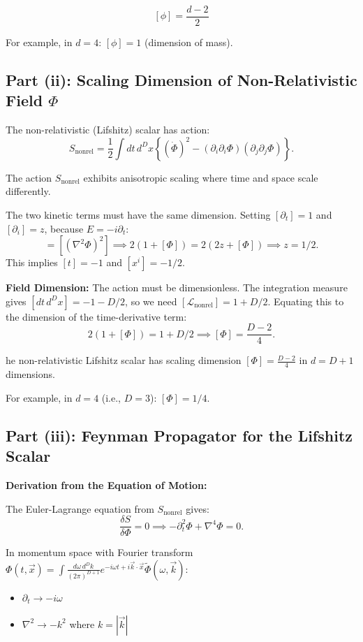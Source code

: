 \documentclass[11pt, a4paper]{article}
\newcommand{\Lscr}{\mathcal{L}}
\newcommand{\be}{\begin{equation}}
\newcommand{\ee}{\end{equation}}
\begin{document}
$$[\phi] = \frac{d-2}{2}$$

For example, in $d = 4$: $[\phi] = 1$ (dimension of mass).

\subsection{Part (ii): Scaling Dimension of Non-Relativistic Field $\Phi$}

The non-relativistic (Lifshitz) scalar has action:
\be
S_{\text{nonrel}}=\frac{1}{2}\int dt\, d^{D}x\left\{(\dot{\Phi})^{2}-(\partial_{i}\partial_{i}\Phi)(\partial_{j}\partial_{j}\Phi)\right\}.
\ee

The action $S_{\text{nonrel}}$ exhibits anisotropic scaling where time and space scale differently.

The two kinetic terms must have the same dimension. Setting $[\partial_t] = 1$ and $[\partial_i] = z$, because $E = -i\partial_t$:
\be
[(\dot{\Phi})^2] = [(\nabla^2\Phi)^2] \implies 2(1+[\Phi]) = 2(2z+[\Phi]) \implies z = 1/2.
\ee
This implies $[t] = -1$ and $[x^i] = -1/2$.

\textbf{Field Dimension:} The action must be dimensionless. The integration measure gives $[dt\,d^Dx] = -1 - D/2$, so we need $[\Lscr_{\text{nonrel}}] = 1 + D/2$. Equating this to the dimension of the time-derivative term:
\be
2(1+[\Phi]) = 1 + D/2 \implies [\Phi] = \frac{D-2}{4}.
\ee

he non-relativistic Lifshitz scalar has scaling dimension $[\Phi] = \frac{D-2}{4}$ in $d = D+1$ dimensions.

For example, in $d = 4$ (i.e., $D = 3$): $[\Phi] = 1/4$.

\subsection{Part (iii): Feynman Propagator for the Lifshitz Scalar}

\textbf{Derivation from the Equation of Motion:}

The Euler-Lagrange equation from $S_{\text{nonrel}}$ gives:
\be
\frac{\delta S}{\delta\Phi} = 0 \implies -\partial_t^2\Phi + \nabla^4\Phi = 0.
\ee

In momentum space with Fourier transform $\Phi(t,\vec{x}) = \int \frac{d\omega\,d^Dk}{(2\pi)^{D+1}} e^{-i\omega t + i\vec{k}\cdot\vec{x}} \tilde{\Phi}(\omega,\vec{k})$:
\begin{itemize}
    \item $\partial_t \to -i\omega$
    \item $\nabla^2 \to -k^2$ where $k = |\vec{k}|$
\end{itemize}
\end{document}
